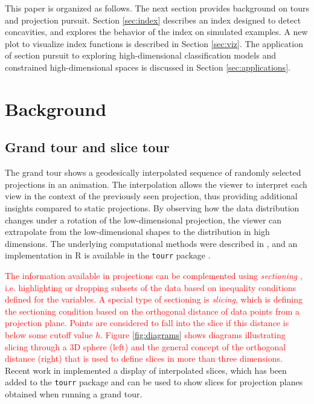 \documentclass[]{interact}
\theoremstyle{plain}%
\theoremstyle{definition}
\theoremstyle{remark}
\begin{document}
This paper is organized as follows. The next section provides background
on tours and projection pursuit. Section \ref{sec:index} describes an
index designed to detect concavities, and explores the behavior of the
index on simulated examples. A new plot to visualize index functions is
described in Section \ref{sec:viz}. The application of section pursuit
to exploring high-dimensional classification models and constrained
high-dimensional spaces is discussed in Section \ref{sec:applications}.

\hypertarget{background}{%
\section{\texorpdfstring{Background
\label{sec:background}}{Background }}\label{background}}

\hypertarget{grand-tour-and-slice-tour}{%
\subsection{Grand tour and slice tour}\label{grand-tour-and-slice-tour}}

The grand tour shows a geodesically interpolated sequence of randomly
selected projections in an animation. The interpolation allows the
viewer to interpret each view in the context of the previously seen
projection, thus providing additional insights compared to static
projections. By observing how the data distribution changes under a
rotation of the low-dimensional projection, the viewer can extrapolate
from the low-dimensional shapes to the distribution in high dimensions.
The underlying computational methods were described in \citet{BCAH05},
and an implementation in R \citep{rlang} is available in the
\texttt{tourr} package \citep{tourr}.

\textcolor{red}{The information available in projections can be complemented using \textit{sectioning}}
\citet{prosection}
\textcolor{red}{, i.e. highlighting or dropping subsets of the data based on inequality conditions defined for the variables. A special type of sectioning is \textit{slicing}, which is defining the sectioning condition based on the orthogonal distance of data points from a projection plane. Points are considered to fall into the slice if this distance is below some cutoff value $h$. Figure \ref{fig:diagrams} shows diagrams illustrating slicing through a 3D sphere (left) and the general concept of the orthogonal distance (right) that is used to define slices in more than three dimensions.}
Recent work in \citet{laa2019slice} implemented a display of
interpolated slices, which has been added to the \texttt{tourr} package
and can be used to show slices for projection planes obtained when
running a grand tour.
\end{document}

